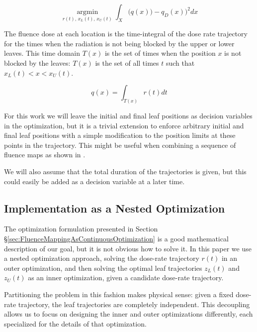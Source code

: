 \begin{equation}
\underset{r(t), \, x_L(t), \, x_U(t)}{\operatorname{argmin}}
\int_X \bigg(q(x)) - q_D(x)\bigg)^2 dx
\label{eqn:fluenceMapOptimization}
\end{equation}

\vspace{6pt}

The fluence dose at each location is the time-integral of the dose rate trajectory for the times
when the radiation is not being blocked by the upper or lower leaves.
This time domain $T(x)$ is the set of times when the position $x$ is not blocked by the leaves:
$T(x)$ is the set of all times $t$ such that $ x_L(t) < x < x_U(t)$.

\begin{equation}
q(x) = \int_{T(x)} r(t) dt
\label{eqn:deliveredFluenceDose}
\end{equation}

For this work we will leave the initial and final leaf positions as decision variables
in the optimization, but it is a trivial extension to enforce arbitrary initial and final
leaf positions with a simple modification to the position limits at these points in the
trajectory. This might be useful when combining a sequence of fluence maps as shown in
.

We will also assume that the total duration of the trajectories is given,
but this could easily be added as a decision variable at a later time.



\subsection{Implementation as a Nested Optimization}

The optimization formulation presented in Section \S \ref{sec:FluenceMappingAsContinuousOptimization}
is a good mathematical description of our goal, but it is not obvious how to solve it.
In this paper we use a nested optimization approach,
solving the dose-rate trajectory $r(t)$ in an outer optimization,
and then solving the optimal leaf trajectories $z_L(t)$ and $z_U(t)$ as an inner optimization,
given a candidate dose-rate trajectory.

Partitioning the problem in this fashion makes physical sense: given a fixed dose-rate trajectory,
the leaf trajectories are completely independent.
This decoupling allows us to focus on designing the inner and outer optimizations differently,
each specialized for the details of that optimization.

